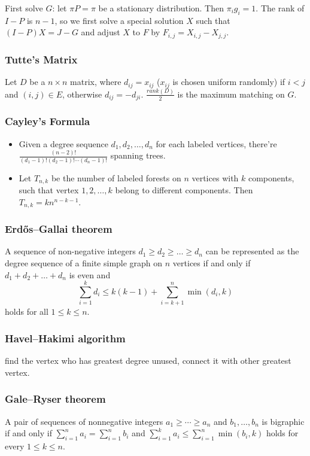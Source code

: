 First solve $G$: let $\pi P = \pi$ be a stationary distribution. Then $\pi_i g_i = 1$.
The rank of $I - P$ is $n - 1$, so we first solve a special solution $X$ such that $(I - P)X = J - G$ and adjust $X$ to $F$ by
$F_{i,j} = X_{i,j} - X_{j,j}$.

\subsubsection{Tutte's Matrix}
Let $D$ be a $n \times n$ matrix, where $d_{ij} = x_{ij}$ ($x_{ij}$ is chosen uniform randomly) if $i < j$ and $(i, j) \in E$, otherwise $d_{ij} = -d_{ji}$. $\frac{rank(D)}{2}$ is the maximum matching on $G$.

\subsubsection{Cayley's Formula}
\begin{itemize}[nosep]
  \item Given a degree sequence $d_1, d_2, \ldots, d_n$ for each labeled vertices, there're $\frac{(n - 2)!}{(d_1 - 1)!(d_2 - 1)!\cdots(d_n - 1)!}$ spanning trees.
  \item Let $T_{n, k}$ be the number of labeled forests on $n$ vertices with $k$ components, such that vertex $1, 2, \ldots, k$ belong to different components. Then $T_{n, k} = kn^{n - k - 1}$.
\end{itemize}

\subsubsection{Erdős–Gallai theorem}
A sequence of non-negative integers $d_1 \geq d_2 \geq \ldots \geq d_n$ can be represented as the degree sequence of a finite simple graph on $n$ vertices if and only if $d_1 + d_2 + \ldots + d_n$ is even and
$$ \sum_{i = 1}^{k}d_i \leq k(k - 1) + \sum_{i = k + 1}^{n}\min(d_i, k) $$
holds for all $1 \leq k \leq n$.

\subsubsection{Havel–Hakimi algorithm}
find the vertex who has greatest degree unused, connect it with other greatest vertex.

\subsubsection{Gale–Ryser theorem}
A pair of sequences of nonnegative integers $a_1\ge\cdots\ge a_n$ and $b_1,\ldots,b_n$ is bigraphic if and only if $\displaystyle\sum_{i=1}^n a_i=\displaystyle\sum_{i=1}^n b_i$ and $\displaystyle\sum_{i=1}^k a_i\le \displaystyle\sum_{i=1}^n\min(b_i,k)$ holds for every $1\le k\le n$.

